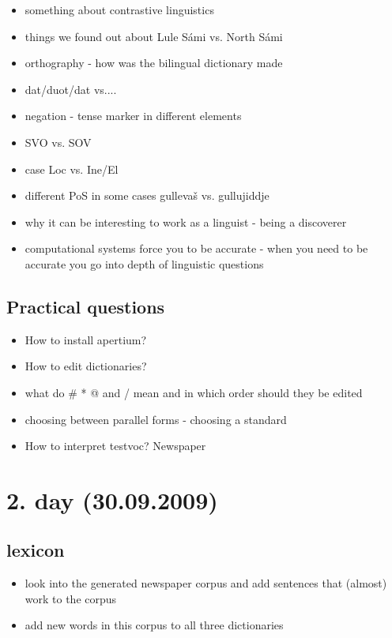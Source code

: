 \documentclass[a4paper,english,12pt]{article}
\begin{document}
\begin{spacing}{1.0}
\begin{itemize}
\item something about contrastive linguistics
\item things we found out about Lule Sámi vs. North Sámi
\item orthography - how was the bilingual dictionary made
\item dat/duot/dat vs....
\item negation - tense marker in different elements
\item SVO vs. SOV
\item case Loc vs. Ine/El
\item different PoS in some cases gullevaš vs. gullujiddje
\item why it can be interesting to work as a linguist - being a discoverer
\item computational systems force you to be accurate - when you need to be accurate you go into depth of linguistic questions
\end{itemize}

\subsection{Practical questions}

\begin{itemize}
\item How to install apertium?
\item    How to edit dictionaries?
\item what do # * @ and / mean and in which order should they be edited
\item choosing between parallel forms - choosing a standard
\item    How to interpret testvoc? Newspaper
\end{itemize}


\section{2. day (30.09.2009)}
\subsection{lexicon}
\begin{itemize}
\item look into the generated newspaper corpus and add sentences that (almost) work to the corpus
\item add new words in this corpus to all three dictionaries
\end{itemize}


\end{spacing}
\end{document}
